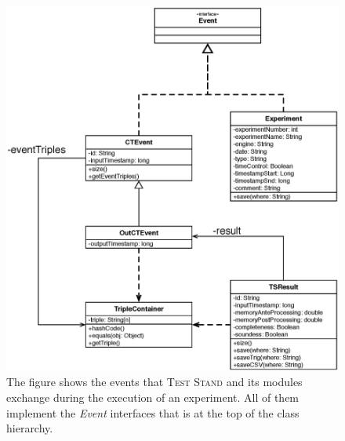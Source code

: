 \begin{figure}[h!tb]
  \centering
	\includegraphics[width=\linewidth]{images/uml_events}
	\caption[\name Execution Events - UML Schema]{The figure shows the events that \name \textsc{Test Stand} and its modules 	exchange during the execution of an experiment. All of them implement the \textit{Event} interfaces that is at the top of the class 	hierarchy.} 
	\label{fig:uml_events}
\end{figure}

